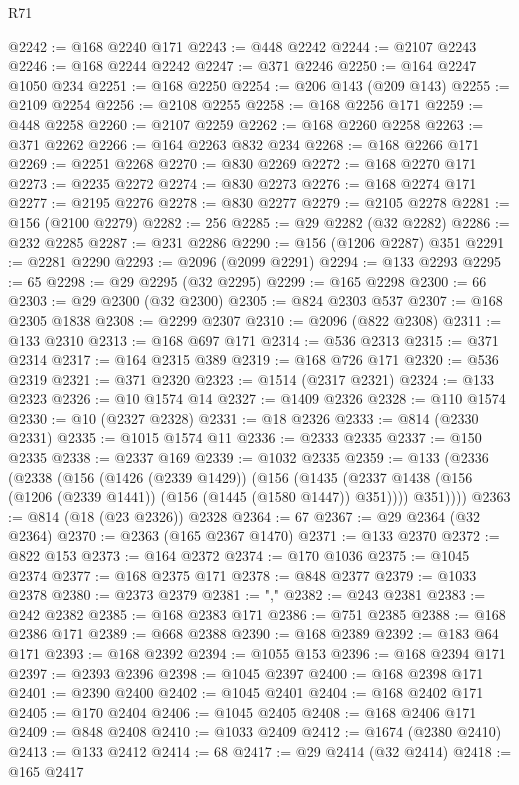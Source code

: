 \begin{lexlean}{R71}
\begin{coremodule}
@2242 := @168 @2240 @171
@2243 := @448 @2242
@2244 := @2107 @2243
@2246 := @168 @2244 @2242
@2247 := @371 @2246
@2250 := @164 @2247 @1050 @234
@2251 := @168 @2250
@2254 := @206 @143 (@209 @143)
@2255 := @2109 @2254
@2256 := @2108 @2255
@2258 := @168 @2256 @171
@2259 := @448 @2258
@2260 := @2107 @2259
@2262 := @168 @2260 @2258
@2263 := @371 @2262
@2266 := @164 @2263 @832 @234
@2268 := @168 @2266 @171
@2269 := @2251 @2268
@2270 := @830 @2269
@2272 := @168 @2270 @171
@2273 := @2235 @2272
@2274 := @830 @2273
@2276 := @168 @2274 @171
@2277 := @2195 @2276
@2278 := @830 @2277
@2279 := @2105 @2278
@2281 := @156 (@2100 @2279)
@2282 := 256
@2285 := @29 @2282 (@32 @2282)
@2286 := @232 @2285
@2287 := @231 @2286
@2290 := @156 (@1206 @2287) @351
@2291 := @2281 @2290
@2293 := @2096 (@2099 @2291)
@2294 := @133 @2293
@2295 := 65
@2298 := @29 @2295 (@32 @2295)
@2299 := @165 @2298
@2300 := 66
@2303 := @29 @2300 (@32 @2300)
@2305 := @824 @2303 @537
@2307 := @168 @2305 @1838
@2308 := @2299 @2307
@2310 := @2096 (@822 @2308)
@2311 := @133 @2310
@2313 := @168 @697 @171
@2314 := @536 @2313
@2315 := @371 @2314
@2317 := @164 @2315 @389
@2319 := @168 @726 @171
@2320 := @536 @2319
@2321 := @371 @2320
@2323 := @1514 (@2317 @2321)
@2324 := @133 @2323
@2326 := @10 @1574 @14
@2327 := @1409 @2326
@2328 := @110 @1574
@2330 := @10 (@2327 @2328)
@2331 := @18 @2326
@2333 := @814 (@2330 @2331)
@2335 := @1015 @1574 @11
@2336 := @2333 @2335
@2337 := @150 @2335
@2338 := @2337 @169
@2339 := @1032 @2335
@2359 := @133
    (@2336
      (@2338
        (@156
          (@1426 (@2339 @1429))
          (@156
            (@1435 (@2337 @1438 (@156 (@1206 (@2339 @1441)) (@156 (@1445 (@1580 @1447)) @351))))
            @351))))
@2363 := @814 (@18 (@23 @2326)) @2328
@2364 := 67
@2367 := @29 @2364 (@32 @2364)
@2370 := @2363 (@165 @2367 @1470)
@2371 := @133 @2370
@2372 := @822 @153
@2373 := @164 @2372
@2374 := @170 @1036
@2375 := @1045 @2374
@2377 := @168 @2375 @171
@2378 := @848 @2377
@2379 := @1033 @2378
@2380 := @2373 @2379
@2381 := ","
@2382 := @243 @2381
@2383 := @242 @2382
@2385 := @168 @2383 @171
@2386 := @751 @2385
@2388 := @168 @2386 @171
@2389 := @668 @2388
@2390 := @168 @2389
@2392 := @183 @64 @171
@2393 := @168 @2392
@2394 := @1055 @153
@2396 := @168 @2394 @171
@2397 := @2393 @2396
@2398 := @1045 @2397
@2400 := @168 @2398 @171
@2401 := @2390 @2400
@2402 := @1045 @2401
@2404 := @168 @2402 @171
@2405 := @170 @2404
@2406 := @1045 @2405
@2408 := @168 @2406 @171
@2409 := @848 @2408
@2410 := @1033 @2409
@2412 := @1674 (@2380 @2410)
@2413 := @133 @2412
@2414 := 68
@2417 := @29 @2414 (@32 @2414)
@2418 := @165 @2417

\end{coremodule}
\end{lexlean}
